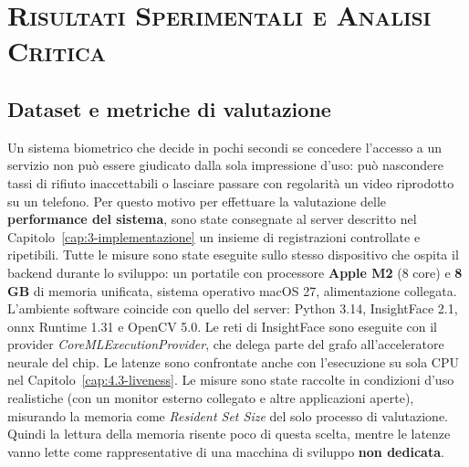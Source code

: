 \chapter{\scshape Risultati Sperimentali e Analisi Critica}\label{cap:4-risultati}

\section{Dataset e metriche di valutazione}
Un sistema biometrico che decide in pochi secondi se concedere l'accesso a un servizio non può essere giudicato dalla sola impressione d'uso: può nascondere tassi di rifiuto inaccettabili o lasciare passare con regolarità un video riprodotto su un telefono.
Per questo motivo per effettuare la valutazione delle \textbf{performance del sistema}, sono state consegnate al server descritto nel Capitolo~\ref{cap:3-implementazione} un insieme di registrazioni controllate e ripetibili.
Tutte le misure sono state eseguite sullo stesso dispositivo che ospita il backend durante lo sviluppo: un portatile con processore \textbf{Apple M2} (8 core) e \textbf{8 GB} di memoria unificata, sistema operativo macOS 27, alimentazione collegata.
L'ambiente software coincide con quello del server: Python 3.14, InsightFace 2.1, \gls{onnx} Runtime 1.31 e OpenCV 5.0.
Le reti di InsightFace sono eseguite con il provider \textit{CoreMLExecutionProvider}, che delega parte del grafo all'acceleratore neurale del chip. Le latenze sono confrontate anche con l'esecuzione su sola CPU nel Capitolo~\ref{cap:4.3-liveness}.
Le misure sono state raccolte in condizioni d'uso realistiche (con un monitor esterno collegato e altre applicazioni aperte), misurando la memoria come \textit{Resident Set Size} del solo processo di valutazione. 
Quindi la lettura della memoria risente poco di questa scelta, mentre le latenze vanno lette come rappresentative di una macchina di sviluppo \textbf{non dedicata}.


